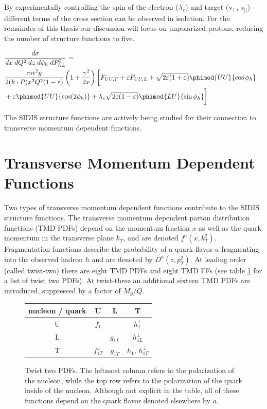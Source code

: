 By experimentally controlling the spin of the electron ($\lambda_e$) and target ($s_{\perp}$, $s_{||}$) different terms of the cross section can be observed in isolation.  For the remainder of this thesis our discussion will focus on unpolarized protons, reducing the number of structure functions to five.  

\begin{eqnarray*} 
        \lefteqn{\frac{d\sigma}{dx \; dQ^2 \; dz \; d\phi_h \; dP_{h\perp}^2} = } \\
         & \frac{\pi \alpha^2 y}{2 (k \cdot P) x^2 Q^2 (1 - \varepsilon)} \left( 1 +
        \frac{\gamma^2}{2x}\right) \biggl[ F_{UU,T} + \varepsilon F_{UU,L} + \sqrt{2 \varepsilon (1 + \varepsilon)} \phimod{UU}{\cos\phi_h} \notag \\
        & + \varepsilon \phimod{UU}{\cos(2\phi_h)} + \lambda_e \sqrt{2 \varepsilon (1 - \varepsilon)} \phimod{LU}{\sin\phi_h} \biggr]
\end{eqnarray*}

The SIDIS structure functions are actively being studied for their connection to transverse momentum dependent functions.

\section{Transverse Momentum Dependent Functions}
Two types of transverse momentum dependent functions contribute to the SIDIS structure functions.  The transverse momentum dependent parton distribution functions (TMD PDFs) depend on the momentum fraction $x$ as well as the quark momentum in the transverse plane $k_{T}$, and are denoted $f^a(x, k_{T}^2)$.  Fragmentation functions describe the probability of a quark flavor $a$ fragmenting into the observed hadron $h$ and are denoted by $D^{a}(z, p_{T}^{2})$.  At leading order (called twist-two) there are eight TMD PDFs and eight TMD FFs (see table \ref{table:twist-two-pdfs} for a list of twist two PDFs).  At twist-three an additional sixteen TMD PDFs are introduced, suppressed by a factor of $M_p/Q$.

\begin{figure}
	\centering
	\begin{tabular}{|c|c|c|c|}
		\hline 
		nucleon / quark & U & L & T \\
		\hline
		U & $f_1$ & & $h_1^{\perp}$ \\
		L & & $g_{1L}$ & $h_{1L}^{\perp}$ \\
		T & $f_{1T}^{\perp}$ & $g_{1T}$ & $h_1$, $h_{1T}^{\perp}$ \\ 
		\hline
	\end{tabular}
	\caption[Twist two PDFs]{Twist two PDFs.  The leftmost column refers to the polarization of the nucleon, while the top row refers to the polarization of the quark inside of the nucleon.  Although not explicit in the table, all of these functions depend on the quark flavor denoted elsewhere by $a$.}
	\label{table:twist-two-pdfs}
\end{figure}

